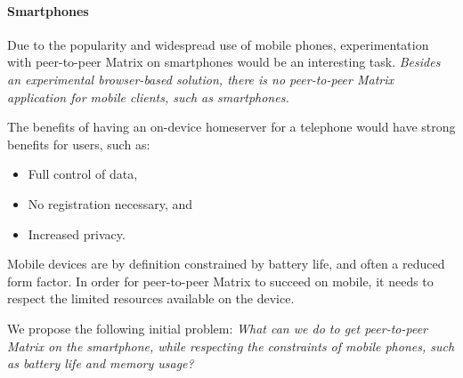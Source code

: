 \paragraph{Smartphones}
Due to the popularity and widespread use of mobile phones, experimentation with peer-to-peer Matrix on smartphones would be an interesting task.
\textit{Besides an experimental browser-based solution\cite{fosdem_event_p2p_matrix}, there is no peer-to-peer Matrix application for mobile clients, such as smartphones.}

The benefits of having an on-device homeserver for a telephone would have strong benefits for users, such as:
\begin{itemize}
    \item Full control of data,
    \item No registration necessary, and
    \item Increased privacy.
\end{itemize}

\noindent Mobile devices are by definition constrained by battery life, and often a reduced form factor.
In order for peer-to-peer Matrix to succeed on mobile, it needs to respect the limited resources available on the device.


\begin{center}
    We propose the following initial problem: \textit{What can we do to get peer-to-peer Matrix on the smartphone, while respecting the constraints of mobile phones, such as battery life and memory usage?}
\end{center}

